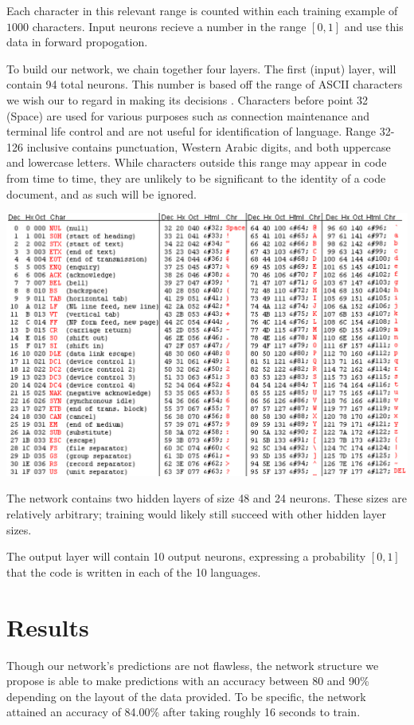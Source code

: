 \documentclass{article}
\begin{document}
Each character in this relevant range is counted within each training example of $1000$ characters. Input neurons recieve a number in the range $[0,1]$ and use this data in forward propogation.

To build our network, we chain together four layers. The first (input) layer, will contain 94 total neurons. This number is based off the range of ASCII characters we wish our to regard in making its decisions \cite{asciitable}. Characters before point 32 (Space) are used for various purposes such as connection maintenance and terminal life control and are not useful for identification of language. Range 32-126 inclusive contains punctuation, Western Arabic digits, and both uppercase and lowercase letters. While characters outside this range may appear in code from time to time, they are unlikely to be significant to the identity of a code document, and as such will be ignored.

\begin{center}
    \includegraphics{asciitable}
\end{center}

The network contains two hidden layers of size 48 and 24 neurons. These sizes are relatively arbitrary; training would likely still succeed with other hidden layer sizes.

The output layer will contain 10 output neurons, expressing a probability $[0,1]$ that the code is written in each of the 10 languages.

\section{Results}
Though our network's predictions are not flawless, the network structure we propose is able to make predictions with an accuracy between 80 and 90\% depending on the layout of the data provided. To be specific, the network attained an accuracy of 84.00\% after taking roughly 16 seconds to train.
\end{document}
